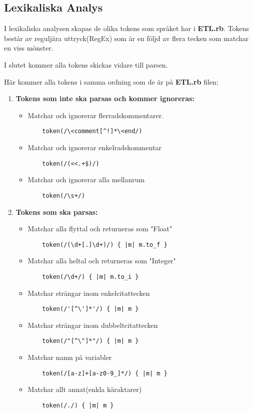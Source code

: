 \documentclass{TDP019mall}
\begin{document}
\subsection{Lexikaliska Analys}
I lexikaliska analysen skapas de olika tokens som språket har i \textbf{ETL.rb}. Tokens består av reguljära uttryck(RegEx) som är en följd av 
flera tecken som matchar en viss mönster. 

I slutet kommer alla tokens skickas vidare till parsen. 
\newpage

Här kommer alla tokens i samma ordning som de är på \textbf{ETL.rb} filen:

\begin{enumerate}

\item \textbf{Tokens som inte ska parsas och kommer ignoreras:}
\begin{itemize}

\item Matchar och ignorerar flerradskommentarer.
\begin{verbatim}
    token(/\<comment[^!]*\<end/)
\end{verbatim}
\item Matchar och ignorerar enkelradskommentar
\begin{verbatim}
    token(/(<<.+$)/)
\end{verbatim}
\item Matchar och ignorerar alla mellanrum
\begin{verbatim}
    token(/\s+/)
\end{verbatim}
\end{itemize}

\item \textbf{Tokens som ska parsas:}
\begin{itemize}
\item Matchar alla flyttal och returneras som "Float"
\begin{verbatim}
    token(/(\d+[.]\d+)/) { |m| m.to_f }
\end{verbatim}
\item Matchar alla heltal och returneras som "Integer"
\begin{verbatim}
    token(/\d+/) { |m| m.to_i }
\end{verbatim}
\item Matchar strängar inom enkelcitattecken
\begin{verbatim}
    token(/'[^\']*'/) { |m| m } 
\end{verbatim}
\item Matchar strängar inom dubbeltcitattecken
\begin{verbatim}
    token(/"[^\"]*"/) { |m| m }
\end{verbatim}
\item Matchar namn på variabler
\begin{verbatim}
    token(/[a-z]+[a-z0-9_]*/) { |m| m }
\end{verbatim}
\item Matchar allt annat(enkla käraktarer)
\begin{verbatim}
    token(/./) { |m| m } 
\end{verbatim}
\end{itemize}
\end{enumerate}
\end{document}
